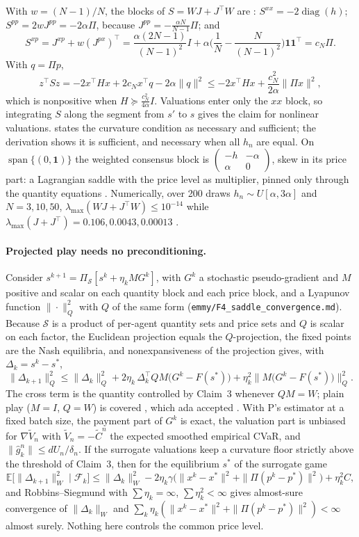 \documentclass{article}
\begin{document}
With \(w=(N-1)/N\), the blocks of \(S=WJ+J^\top W\) are : \(S^{xx}=-2\operatorname{diag}(h)\); \(S^{pp}=2wJ^{pp}=-2\alpha\Pi\), because \(J^{pp}=-\tfrac{\alpha N}{N-1}\Pi\); and
\[
S^{xp}=J^{xp}+w(J^{px})^\top=\frac{\alpha(2N-1)}{(N-1)^2}I+\alpha\Big(\frac1N-\frac{N}{(N-1)^2}\Big)\mathbf 1\mathbf 1^\top=c_N\Pi .
\]
With \(q=\Pi p\),
\[
z^\top Sz=-2x^\top Hx+2c_Nx^\top q-2\alpha\|q\|^2\le-2x^\top Hx+\frac{c_N^2}{2\alpha}\|\Pi x\|^2,
\]
which is nonpositive when \(H\succeq\tfrac{c_N^2}{4\alpha}I\). Valuations enter only the \(xx\) block, so integrating \(S\) along the segment from \(s'\) to \(s\) gives the claim for nonlinear valuations.  states the curvature condition as necessary and sufficient; the derivation shows it is sufficient, and necessary when all \(h_n\) are equal. On \(\operatorname{span}\{(0,\mathbf 1)\}\) the weighted consensus block is \(\begin{pmatrix}-h&-\alpha\\\alpha&0\end{pmatrix}\), skew in its price part: a Lagrangian saddle with the price level as multiplier, pinned only through the quantity equations . Numerically, over 200 draws \(h_n\sim U[\alpha,3\alpha]\) and \(N=3,10,50\), \(\lambda_{\max}(WJ+J^\top W)\le10^{-14}\) while \(\lambda_{\max}(J+J^\top)=0.106,0.0043,0.00013\) .

\paragraph{Projected play needs no preconditioning.}
Consider \(s^{k+1}=\Pi_{\mathcal S}[s^k+\eta_kMG^k]\), with \(G^k\) a stochastic pseudo-gradient and \(M\) positive and scalar on each quantity block and each price block, and a Lyapunov function \(\|\cdot\|_Q^2\) with \(Q\) of the same form  (\texttt{emmy/F4\_saddle\_convergence.md}). Because \(\mathcal S\) is a product of per-agent quantity sets and price sets and \(Q\) is scalar on each factor, the Euclidean projection equals the \(Q\)-projection, the fixed points are the Nash equilibria, and nonexpansiveness of the projection gives, with \(\Delta_k=s^k-s^\ast\),
\[
\|\Delta_{k+1}\|_Q^2\le\|\Delta_k\|_Q^2+2\eta_k\,\Delta_k^\top QM\big(G^k-F(s^\ast)\big)+\eta_k^2\big\|M\big(G^k-F(s^\ast)\big)\big\|_Q^2 .
\]
The cross term is the quantity controlled by Claim~3 whenever \(QM=W\); plain play (\(M=I\), \(Q=W\)) is covered , which ada accepted . With P's estimator at a fixed batch size, the payment part of \(G^k\) is exact, the valuation part is unbiased for \(\nabla\widetilde V_n\) with \(\widetilde V_n=-\widetilde C^n\) the expected smoothed empirical CVaR, and \(\|\hat g^n_k\|\le dU_n/\delta_n\). If the surrogate valuations keep a curvature floor strictly above the threshold of Claim~3, then for the equilibrium \(s^\ast\) of the surrogate game 
\[
\mathbb E\big[\|\Delta_{k+1}\|_W^2\mid\mathcal F_k\big]\le\|\Delta_k\|_W^2-2\eta_k\gamma\big(\|x^k-x^\ast\|^2+\|\Pi(p^k-p^\ast)\|^2\big)+\eta_k^2C,
\]
and Robbins--Siegmund with \(\sum\eta_k=\infty\), \(\sum\eta_k^2<\infty\) gives almost-sure convergence of \(\|\Delta_k\|_W\) and \(\sum_k\eta_k(\|x^k-x^\ast\|^2+\|\Pi(p^k-p^\ast)\|^2)<\infty\) almost surely. Nothing here controls the common price level.
\end{document}
